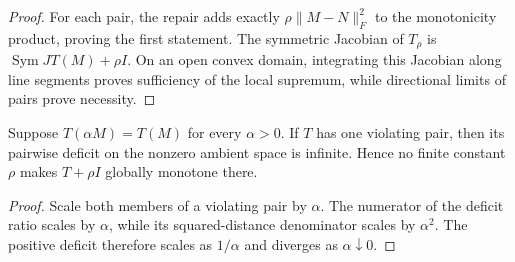 \begin{proof}
  For each pair, the repair adds exactly $\rho\lVert M-N\rVert_F^2$ to the
  monotonicity product, proving the first statement.  The symmetric Jacobian
  of $T_\rho$ is $\operatorname{Sym}JT(M)+\rho I$.  On an open convex domain,
  integrating this Jacobian along line segments proves sufficiency of the
  local supremum, while directional limits of pairs prove necessity.
\end{proof}

\begin{proposition}
  Suppose $T(\alpha M)=T(M)$ for every $\alpha>0$.  If $T$ has one violating
  pair, then its pairwise deficit on the nonzero ambient space is infinite.
  Hence no finite constant $\rho$ makes $T+\rho I$ globally monotone there.
\end{proposition}

\begin{proof}
  Scale both members of a violating pair by $\alpha$.  The numerator of the
  deficit ratio scales by $\alpha$, while its squared-distance denominator
  scales by $\alpha^2$.  The positive deficit therefore scales as
  $1/\alpha$ and diverges as $\alpha\downarrow0$.
\end{proof}
